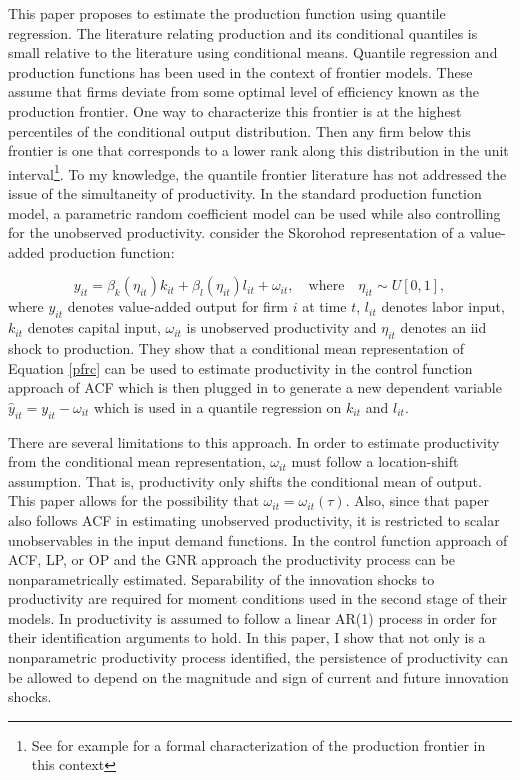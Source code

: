 \documentclass{article}
\begin{document}
This paper proposes to estimate the production function using quantile regression. The literature relating production and its conditional quantiles is small relative to the literature using conditional means. Quantile regression and production functions has been used in the context of frontier models. These assume that firms deviate from some optimal level of efficiency known as the production frontier. One way to characterize this frontier is at the highest percentiles of the conditional output distribution. Then any firm below this frontier is one that corresponds to a lower rank along this distribution in the unit interval\footnote{See for example \cite{Aragon2005} for a formal characterization of the production frontier in this context}. To my knowledge, the quantile frontier literature has not addressed the issue of the simultaneity of productivity. In the standard production function model, a parametric random coefficient model can be used while also controlling for the unobserved productivity. \cite{DS2021} consider the Skorohod representation of a value-added production function:

\begin{equation} \label{pfrc}
    y_{it}=\beta_{k}(\eta_{it})k_{it}+\beta_{l}(\eta_{it})l_{it}+\omega_{it}, \quad \text{where}\quad \eta_{it}\sim U[0,1],
\end{equation}
where $y_{it}$ denotes value-added output for firm $i$ at time $t$, $l_{it}$ denotes labor input, $k_{it}$ denotes capital input, $\omega_{it}$ is unobserved productivity and $\eta_{it}$ denotes an iid shock to production. They show that a conditional mean representation of Equation \eqref{pfrc} can be used to estimate productivity in the control function approach of ACF which is then plugged in to generate a new dependent variable $\hat{y}_{it}=y_{it}-\omega_{it}$ which is used in a quantile regression on $k_{it}$ and $l_{it}$. 

There are several limitations to this approach. In order to estimate productivity from the conditional mean representation, $\omega_{it}$ must follow a location-shift assumption. That is, productivity only shifts the conditional mean of output. This paper allows for the possibility that $\omega_{it}=\omega_{it}(\tau)$. Also, since that paper also follows ACF in estimating unobserved productivity, it is restricted to scalar unobservables in the input demand functions. In the control function approach of ACF, LP, or OP and the GNR approach the productivity process can be nonparametrically estimated. Separability of the innovation shocks to productivity are required for moment conditions used in the second stage of their models. In \cite{DS2021} productivity is assumed to follow a linear AR(1) process in order for their identification arguments to hold. In this paper, I show that not only is a nonparametric productivity process identified, the persistence of productivity can be allowed to depend on the magnitude and sign of current and future innovation shocks.
\end{document}

